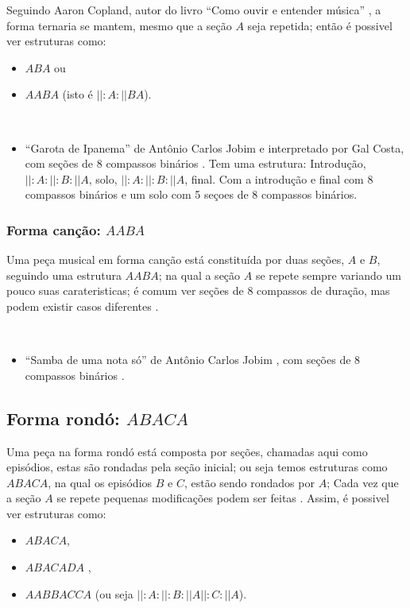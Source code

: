 Seguindo  Aaron Copland, autor do livro ``Como ouvir e entender música'' \cite[pp. 89]{copland1974ouvir},
a forma ternaria se mantem, mesmo que a seção $A$ seja repetida;
então é possivel ver estruturas como: 
\begin{itemize}
\item $ABA$ ou
\item $AABA$ (isto é $||:A:||BA$).
\end{itemize}

\begin{example} ~
\begin{itemize}
\item ``Garota de Ipanema'' de Antônio Carlos Jobim e interpretado por Gal Costa,
com seções de 8 compassos binários \cite{partituragarotaipanema1} \cite{partituragarotaipanema2}.
Tem uma estrutura: Introdução, $||:A:||:B:||A$, solo,  $||:A:||:B:||A$, final.
Com a introdução e final com 8 compassos binários 
e um solo com 5 seçoes de 8 compassos binários.
\end{itemize}
\end{example}

\subsubsection{Forma canção: $AABA$}
\label{subsec:formacancao}
Uma peça musical em forma canção está constituída por duas seções, $A$ e $B$,
seguindo uma estrutura $AABA$; 
na qual a seção $A$ se repete sempre variando um pouco suas carateristicas;
é comum ver seções de 8 compassos de duração, mas podem existir casos diferentes
\cite[pp. 53]{colluraimprovisacao} \cite[pp. 16]{adolfo1997composicao}.
\begin{example} ~
\begin{itemize}
\item ``Samba de uma nota só'' de Antônio Carlos Jobim \cite[pp. 53]{colluraimprovisacao} \cite[pp. 16]{adolfo1997composicao},
com seções de 8 compassos binários \cite{partiturasambadeumanotaso1}.
\end{itemize}
\end{example}

\subsection{Forma rondó: $ABACA$}
\label{subsec:formarondo}
Uma peça na forma rondó está composta por seções, 
chamadas aqui como episódios, estas são rondadas pela seção inicial;
ou seja temos estruturas como $ABACA$, na qual os episódios $B$ e $C$,
estão sendo rondados por $A$;
Cada vez que a seção $A$ se repete 
pequenas modificações podem ser feitas \cite[pp. 72]{bennett1993elementos}.
Assim, é possivel ver estruturas como: 
\begin{itemize}
\item $ABACA$,
\item $ABACADA$ \cite[pp. 98]{copland1974ouvir},
\item $AABBACCA$ (ou seja $||:A:||:B:||A||:C:||A$).
\end{itemize}

